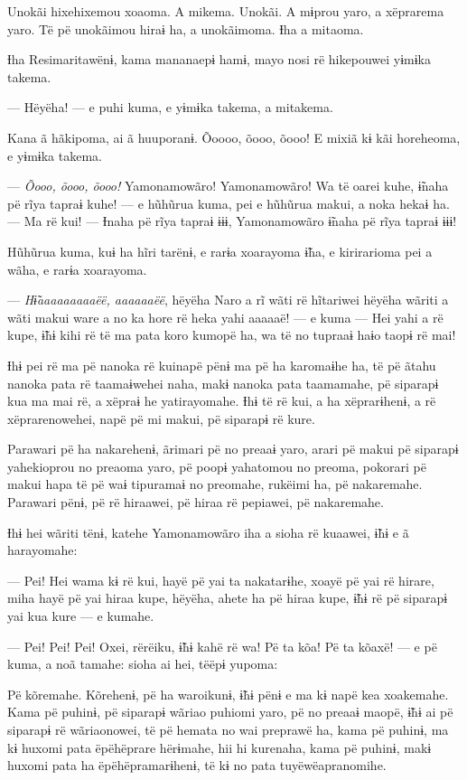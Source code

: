 Unokãi hixehixemou xoaoma. A mikema. Unokãi. A mɨprou yaro, a xëprarema
yaro. Të pë unokãimou hiraɨ ha, a unokãimoma. Ɨha a mitaoma. 

Ɨha Resimaritawënɨ, kama mananaepɨ hamɨ, mayo nosi rë hikepouwei yɨmɨka
takema. 

--- Hëyëha! --- e puhi kuma, e yɨmɨka takema, a mitakema. 

Kana ã hãkipoma, ai ã huuporanɨ. Õoooo, õooo, õooo! E mixiã kɨ kãi
horeheoma, e yɨmɨka takema. 

--- \textit{Õooo, õooo, õooo!} Yamonamowãro! Yamonamowãro! Wa të oarei kuhe,
ɨ̃naha pë rĩya tapraɨ kuhe! --- e hũhũrua kuma, pei e hũhũrua makui, a
noka hekaɨ ha. --- Ma rë kui! --- Ɨnaha pë rĩya tapraɨ ɨɨɨ, Yamonamowãro
ɨ̃naha pë rĩya tapraɨ ɨɨɨ! 

Hũhũrua kuma, kuɨ ha hĩri tarënɨ, e rarɨa xoarayoma ɨ̃ha, e kirirarioma
pei a wãha, e rarɨa xoarayoma. 

--- \textit{Hɨ̃aaaaaaaaaëë, aaaaaaëë}, hëyëha Naro a rĩ wãti rë hĩtariwei hëyëha
wãriti a wãti makui ware a no ka hore rë heka yahi aaaaaë! --- e kuma
--- Hei yahi a rë kupe, ɨ̃hɨ kihi rë të ma pata koro kumopë ha, wa të no
tupraaɨ haɨo taopɨ rë mai! 

Ɨhɨ pei rë ma pë nanoka rë kuinapë pënɨ ma pë ha karomaɨhe ha, të pë
ãtahu nanoka pata rë taamaɨwehei naha, makɨ nanoka pata taamamahe, pë
siparapɨ kua ma mai rë, a xëpraɨ he yatirayomahe. Ɨhɨ të rë kui, a ha
xëprarɨhenɨ, a rë xëprarenowehei, napë pë mi makui, pë siparapɨ rë
kure. 

Parawari pë ha nakarehenɨ, ãrimari pë no preaaɨ yaro, arari pë makui pë
siparapɨ yahekioprou no preaoma yaro, pë poopɨ yahatomou no preoma,
pokorari pë makui hapa të pë waɨ tipuramaɨ no preomahe, rukëimi ha, pë
nakaremahe. Parawari pënɨ, pë rë hiraawei, pë hiraa rë pepiawei, pë
nakaremahe. 

Ɨhɨ hei wãriti tënɨ, katehe Yamonamowãro iha a sioha rë kuaawei, ɨ̃hɨ e ã
harayomahe: 

--- Pei! Hei wama kɨ rë kui, hayë pë yai ta nakatarɨhe, xoayë pë yai rë
hirare, miha hayë pë yai hiraa kupe, hëyëha, ahete ha pë hiraa kupe, ɨ̃hɨ
rë pë siparapɨ yai kua kure --- e kumahe. 

--- Pei! Pei! Pei! Oxei, rërëiku, ɨ̃hɨ kahë rë wa! Pë ta kõa! Pë ta
 kõaxë! --- e pë kuma, a noã tamahe: sioha ai hei, tëëpɨ yupoma: 

Pë kõremahe. Kõrehenɨ, pë ha waroikunɨ, ɨ̃hɨ pënɨ e ma kɨ napë kea
 xoakemahe. Kama pë puhinɨ, pë siparapɨ wãriao puhiomi yaro, pë no preaaɨ
 maopë, ɨ̃hɨ ai pë siparapɨ rë wãriaonowei, të pë hemata no wai preprawë
 ha, kama pë puhinɨ, ma kɨ huxomi pata ëpëhëprare hërɨmahe, hii hi
 kurenaha, kama pë puhinɨ, makɨ huxomi pata ha ëpëhëpramarɨhenɨ, të kɨ no
 pata tuyëwëapranomihe. 

